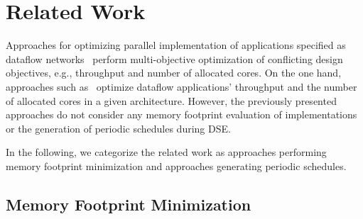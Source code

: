 \section{Related Work}\label{sec:relwork}

Approaches for optimizing parallel implementation of applications specified as dataflow networks~\cite{FunState} perform multi-objective optimization of conflicting design objectives, e.g., throughput and number of allocated cores.
On the one hand, approaches such as~\cite{Letras:2020,falk} optimize dataflow applications' throughput and the number of allocated cores in a given architecture.
However, the previously presented approaches do not consider any memory footprint evaluation of implementations or the generation of periodic schedules during \ac{DSE}.
\par
In the following, we categorize the related work as approaches performing memory footprint minimization and approaches generating periodic schedules.

\subsection{Memory Footprint Minimization}

